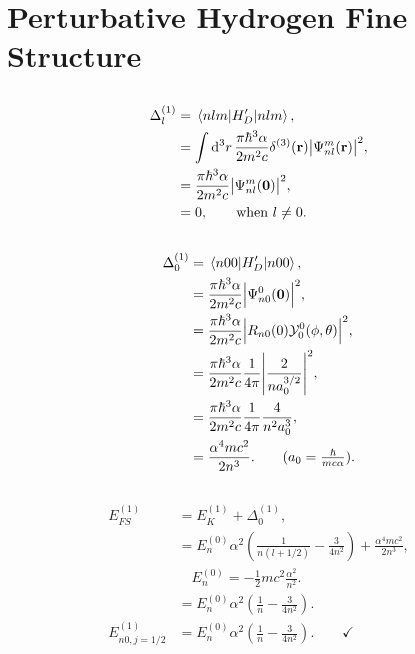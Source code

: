 \documentclass[
a4paper,
10pt,
twoside,
]{article}
\begin{document}
\titleinf
\maketitle
\startmcols

\section{Perturbative Hydrogen Fine Structure}\label{sec: I}
\subsection{}\label{ssec: Ia}
\begin{align}
	\Delta_{l}^{(1)} &= \mel*{nlm}{H_D'}{nlm},\\
	&= \int \dd[3]{r} \frac{\pi\hbar^3\alpha}{2m^2c} \delta^{(3)}(\vb{r}) \abs{\Psi_{nl}^{m}(\vb{r})}^2,\\
	&= \frac{\pi\hbar^3\alpha}{2m^2c} \abs{\Psi_{nl}^{m}(\vb{0})}^2,\\
	&= 0, \qquad \text{when $l\neq 0$}.
\end{align}

\subsection{}\label{ssec: Ib}

\begin{align}
	\Delta_{0}^{(1)} &= \mel*{n00}{H_D'}{n00},\\
	&= \frac{\pi\hbar^3\alpha}{2m^2c} \abs{\Psi_{n0}^{0}(\vb{0})}^2,\\
	&= \frac{\pi\hbar^3\alpha}{2m^2c} \abs{R_{n0}(0)\mathcal{Y}_0^{0}(\phi,\theta)}^2,\\
	&= \frac{\pi\hbar^3\alpha}{2m^2c} \frac{1}{4\pi}\abs{\frac{2}{n a_0^{3/2}}}^2,\\
	&= \frac{\pi\hbar^3\alpha}{2m^2c} \frac{1}{4\pi}\frac{4}{n^2 a_0^3},\\
	&= \frac{\alpha^4 mc^2}{2n^3}. \qquad (a_0 = \tfrac{\hbar}{mc\alpha}).
\end{align}

\subsection{}\label{ssec: Ic}
\begin{align}
	E_{FS}^{(1)} &= E_{K}^{(1)} + \Delta_{0}^{(1)},\\
	&= E_n^{(0)}\alpha^2\left(\frac{1}{n(l+1/2)}-\frac{3}{4n^2}\right) + \frac{\alpha^4 mc^2}{2n^3},\\
	&\quad E_n^{(0)}=-\frac{1}{2}mc^2 \frac{\alpha^2}{n^2}.\\
	&= E_n^{(0)}\alpha^2\left(\frac{1}{n}-\frac{3}{4n^2}\right).\\
	E_{n0,j=1/2}^{(1)} &= E_n^{(0)}\alpha^2\left(\frac{1}{n}-\frac{3}{4n^2}\right). \qquad \checkmark
\end{align}
\end{document}
